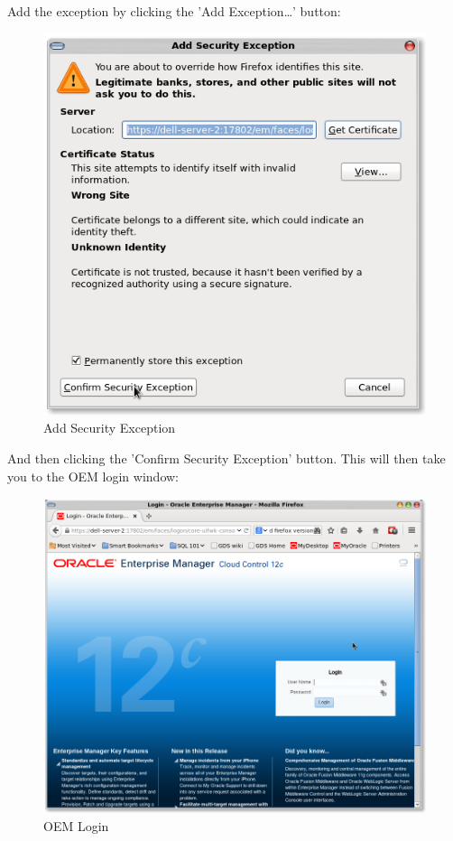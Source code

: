 \documentclass[11pt]{article}
\begin{document}
\clearpage
Add the exception by clicking the 'Add Exception\ldots{}' button:
\begin{figure}[htb]
\centering
\includegraphics[width=.9\linewidth]{images/Browser_Certificate_3.png}
\caption{Add Security Exception}
\end{figure}
\clearpage
And then clicking the 'Confirm Security Exception' button. This will then take you to the OEM login window:
\begin{figure}[htb]
\centering
\includegraphics[width=.9\linewidth]{images/Screenshot-Login-OracleEnterpriseManager-MozillaFirefox.png}
\caption{OEM Login}
\end{figure}
\clearpage
\end{document}
